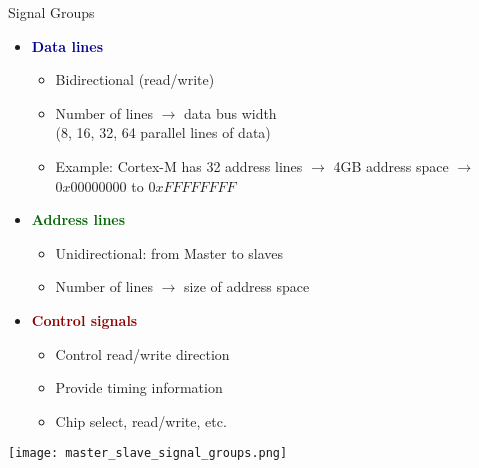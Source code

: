 \begin{theorem}{Signal Groups}
    \begin{itemize}
        \item \textcolor{darkblue}{\textbf{Data lines}}
        \begin{itemize}
            \item Bidirectional (read/write)
            \item Number of lines $\rightarrow$ data bus width \\(8, 16, 32, 64 parallel lines of data)
            \item Example: Cortex-M has 32 address lines $\rightarrow$ 4GB address space $\rightarrow$ $0x00000000$ to $0xFFFFFFFF$
        \end{itemize}
        \item \textcolor{darkgreen}{\textbf{Address lines}}
        \begin{itemize}
            \item Unidirectional: from Master to slaves
            \item Number of lines $\rightarrow$ size of address space
        \end{itemize}
        \item \textcolor{darkred}{\textbf{Control signals}}
        \begin{itemize}
            \item Control read/write direction
            \item Provide timing information
            \item Chip select, read/write, etc.
        \end{itemize}
    \end{itemize}
    \texttt{[image: master\_slave\_signal\_groups.png]}
\end{theorem}

